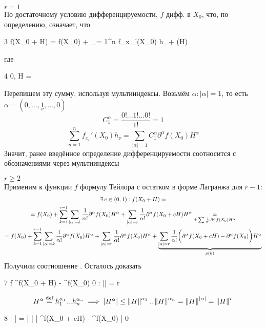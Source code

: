 \begin{iproof}
	\item $ r = 1 $ \\
	По достаточному условию дифференцируемости, $ f $ дифф. в $ X_0 $, что, по определению, означает, что
	\begin{equ}3
		f(X_0 + H) = f(X_0) + \sum_{\nu = 1}^n f_{x_\nu}'(X_0) h_\nu + \rho(H)
	\end{equ}
	где
	\begin{equ}4
		  0, \qquad H = \column{h_1}{h_n}
	\end{equ}
	Перепишем эту сумму, используя мультииндексы. Возьмём $ \alpha : |\alpha| = 1 $, то есть $ \alpha = (0, ..., \underset\nu1, ..., 0) $
	$$ C_1^\alpha = \frac{0!...1!...0!}{1!} = 1 $$
	$$ \sum_{n = 1}^n f_{x_\nu}'(X_0)h_\nu = \sum_{|\alpha| = 1}C_1^\alpha \partial^\alpha f(X_0) H^\alpha $$
	Значит, ранее введённое определение дифференцируемости соотносится с обозначениями через мультииндексы
	\item $ r \ge 2 $ \\
	Применим к функции $ f $ формулу Тейлора с остатком в форме Лагранжа для $ r - 1 $:
	\begin{multline}\lbl6
		\exist c \in (0, 1) : f(X_0 + H) = \\
		= f(X_0) + \sum_{k = 1}^{r - 1} \sum_{|\alpha| = k} \frac1{\alpha!} \partial^\alpha f(X_0)H^\alpha + \sum_{|\alpha| = r} \frac1{\alpha!} \partial^\alpha f(X_0 + cH)H^\alpha \underset{\pm \sum \frac1{\alpha!} \partial^\alpha f(X_0)H^\alpha}= \\
		= f(X_0) + \sum_{k = 1}^{r - 1} \sum_{|\alpha| = k} \frac1{\alpha!} \partial^\alpha f(X_0) H^\alpha + \sum_{|\alpha| = r} \frac1{\alpha!} \partial^\alpha f(X_0) H^\alpha + \underbrace{\sum_{|\alpha| = r} \frac1{\alpha!} \bigg( \partial^\alpha f(X_0 + cH) - \partial^\alpha f(X_0) \bigg)H^\alpha}_{\rho(h)}
	\end{multline}
	Получили соотношение . Осталось доказать \eref2
	\begin{equ}7
		f \in \Cont[r]\omega \bydef[\implies] \partial^\alpha f(X_0 + H) - \partial^\alpha f(X_0)  0 \qquad \forall \alpha : |\alpha| = r
	\end{equ}
	$$ H^\alpha \stackrel{\text{def}}{=} h_1^{\alpha_1}...h_n^{\alpha_n} \implies |H^\alpha| \le \left\|{H}\right\|^{\alpha_1}..\left\|{H}\right\|^{\alpha_n} = \left\|{H}\right\|^{|\alpha|} = \left\|{H}\right\|^r $$
	\begin{equ}8
		\bigg|  \bigg| = \bigg|  \bigg| \le \bigg| \partial^\alpha f(X_0 + cH) - \partial^\alpha f(X_0) \bigg| \underarr{H \to \On} 0
	\end{equ}
\end{iproof}

